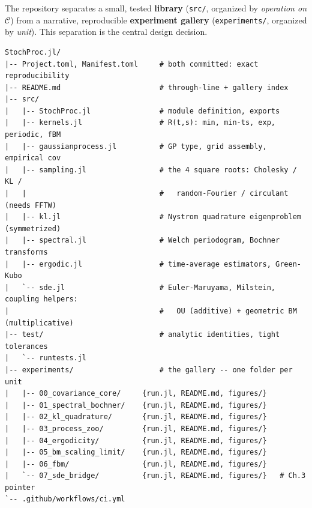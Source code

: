 \documentclass[11pt]{article}
\begin{document}
The repository separates a small, tested \textbf{library} (\texttt{src/}, organized by \emph{operation on $\mathcal{C}$}) from a narrative, reproducible \textbf{experiment gallery} (\texttt{experiments/}, organized by \emph{unit}). This separation is the central design decision.

\begin{lstlisting}
StochProc.jl/
|-- Project.toml, Manifest.toml     # both committed: exact reproducibility
|-- README.md                       # through-line + gallery index
|-- src/
|   |-- StochProc.jl                # module definition, exports
|   |-- kernels.jl                  # R(t,s): min, min-ts, exp, periodic, fBM
|   |-- gaussianprocess.jl          # GP type, grid assembly, empirical cov
|   |-- sampling.jl                 # the 4 square roots: Cholesky / KL /
|   |                               #   random-Fourier / circulant (needs FFTW)
|   |-- kl.jl                       # Nystrom quadrature eigenproblem (symmetrized)
|   |-- spectral.jl                 # Welch periodogram, Bochner transforms
|   |-- ergodic.jl                  # time-average estimators, Green-Kubo
|   `-- sde.jl                      # Euler-Maruyama, Milstein, coupling helpers:
|                                   #   OU (additive) + geometric BM (multiplicative)
|-- test/                           # analytic identities, tight tolerances
|   `-- runtests.jl
|-- experiments/                    # the gallery -- one folder per unit
|   |-- 00_covariance_core/     {run.jl, README.md, figures/}
|   |-- 01_spectral_bochner/    {run.jl, README.md, figures/}
|   |-- 02_kl_quadrature/       {run.jl, README.md, figures/}
|   |-- 03_process_zoo/         {run.jl, README.md, figures/}
|   |-- 04_ergodicity/          {run.jl, README.md, figures/}
|   |-- 05_bm_scaling_limit/    {run.jl, README.md, figures/}
|   |-- 06_fbm/                 {run.jl, README.md, figures/}
|   `-- 07_sde_bridge/          {run.jl, README.md, figures/}   # Ch.3 pointer
`-- .github/workflows/ci.yml
\end{lstlisting}
\end{document}
